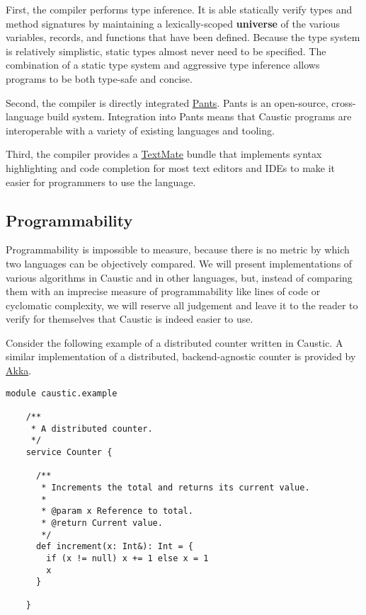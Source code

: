 \documentclass[../main.tex]{subfiles}
\begin{document}
  First, the compiler performs type inference. It is able statically verify types and method
  signatures by maintaining a lexically-scoped \textbf{universe} of the various variables, records,
  and functions that have been defined. Because the type system is relatively simplistic, static
  types almost never need to be specified. The combination of a static type system and aggressive
  type inference allows programs to be both type-safe and concise.

  Second, the compiler is directly integrated \href{https://www.pantsbuild.org/}{Pants}. Pants is an
  open-source, cross-language build system. Integration into Pants means that Caustic programs are
  interoperable with a variety of existing languages and tooling.

  Third, the compiler provides a \href{https://macromates.com/}{TextMate} bundle that implements
  syntax highlighting and code completion for most text editors and IDEs to make it easier for
  programmers to use the language.

  \subsection{Programmability}
  Programmability is impossible to measure, because there is no metric by which two languages can be
  objectively compared. We will present implementations of various algorithms in Caustic and in
  other languages, but, instead of comparing them with an imprecise measure of programmability like
  lines of code or cyclomatic complexity, we will reserve all judgement and leave it to the reader
  to verify for themselves that Caustic is indeed easier to use.

  Consider the following example of a distributed counter written in Caustic. A similar
  implementation of a distributed, backend-agnostic counter is provided by
  \href{https://git.io/vxS6u}{Akka}.

  \begin{lstlisting}[style=Caustic]
    module caustic.example

    /**
     * A distributed counter.
     */
    service Counter {

      /**
       * Increments the total and returns its current value.
       *
       * @param x Reference to total.
       * @return Current value.
       */
      def increment(x: Int&): Int = {
        if (x != null) x += 1 else x = 1
        x
      }

    }
  \end{lstlisting}
\end{document}
